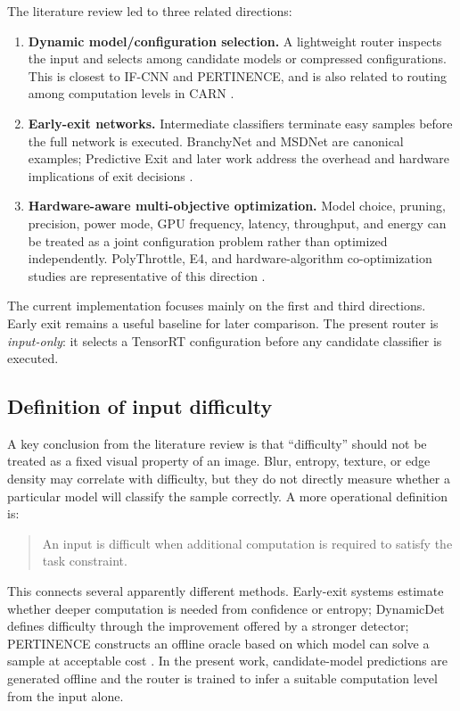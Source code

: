 \documentclass[11pt,a4paper]{article}
\begin{document}
The literature review led to three related directions:

\begin{enumerate}
    \item \textbf{Dynamic model/configuration selection.} A lightweight router inspects the input and selects among candidate models or compressed configurations. This is closest to IF-CNN and PERTINENCE, and is also related to routing among computation levels in CARN \cite{shu2018ifcnn,shende2026pertinence,gaire2025carn}.
    \item \textbf{Early-exit networks.} Intermediate classifiers terminate easy samples before the full network is executed. BranchyNet and MSDNet are canonical examples; Predictive Exit and later work address the overhead and hardware implications of exit decisions \cite{branchynet,msdnet,predictiveexit}.
    \item \textbf{Hardware-aware multi-objective optimization.} Model choice, pruning, precision, power mode, GPU frequency, latency, throughput, and energy can be treated as a joint configuration problem rather than optimized independently. PolyThrottle, E4, and hardware-algorithm co-optimization studies are representative of this direction \cite{polythrottle,e4,zniber2026}.
\end{enumerate}

The current implementation focuses mainly on the first and third directions. Early exit remains a useful baseline for later comparison. The present router is \emph{input-only}: it selects a TensorRT configuration before any candidate classifier is executed.

\subsection{Definition of input difficulty}

A key conclusion from the literature review is that ``difficulty'' should not be treated as a fixed visual property of an image. Blur, entropy, texture, or edge density may correlate with difficulty, but they do not directly measure whether a particular model will classify the sample correctly. A more operational definition is:

\begin{quote}
An input is difficult when additional computation is required to satisfy the task constraint.
\end{quote}

This connects several apparently different methods. Early-exit systems estimate whether deeper computation is needed from confidence or entropy; DynamicDet defines difficulty through the improvement offered by a stronger detector; PERTINENCE constructs an offline oracle based on which model can solve a sample at acceptable cost \cite{dynamicdet,shende2026pertinence}. In the present work, candidate-model predictions are generated offline and the router is trained to infer a suitable computation level from the input alone.
\end{document}
